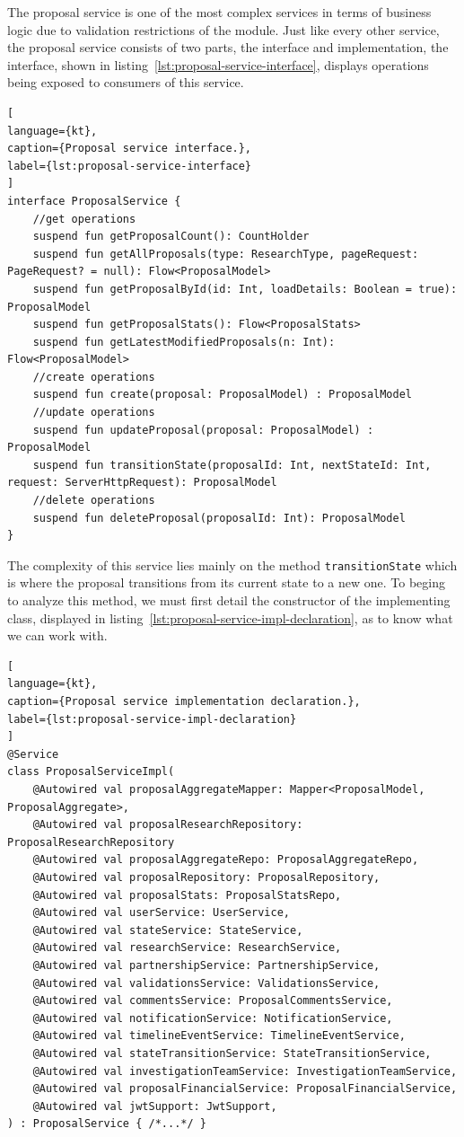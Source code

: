The proposal service is one of the most complex services in terms of business logic due to validation restrictions of the module. Just like every other service, the proposal service consists of two parts, the interface and implementation, the interface, shown in listing~\ref{lst:proposal-service-interface}, displays operations being exposed to consumers of this service.

\begin{lstlisting}[
language={kt},
caption={Proposal service interface.},
label={lst:proposal-service-interface}
]
interface ProposalService {
    //get operations
    suspend fun getProposalCount(): CountHolder
    suspend fun getAllProposals(type: ResearchType, pageRequest: PageRequest? = null): Flow<ProposalModel>
    suspend fun getProposalById(id: Int, loadDetails: Boolean = true): ProposalModel
    suspend fun getProposalStats(): Flow<ProposalStats>
    suspend fun getLatestModifiedProposals(n: Int): Flow<ProposalModel>
    //create operations
    suspend fun create(proposal: ProposalModel) : ProposalModel
    //update operations
    suspend fun updateProposal(proposal: ProposalModel) : ProposalModel
    suspend fun transitionState(proposalId: Int, nextStateId: Int, request: ServerHttpRequest): ProposalModel
    //delete operations
    suspend fun deleteProposal(proposalId: Int): ProposalModel
}
\end{lstlisting}

The complexity of this service lies mainly on the method \lstinline{transitionState} which is where the proposal transitions from its current state to a new one. To beging to analyze this method, we must first detail the constructor of the implementing class, displayed in listing~\ref{lst:proposal-service-impl-declaration}, as to know what we can work with. 

\begin{lstlisting}[
language={kt},
caption={Proposal service implementation declaration.},
label={lst:proposal-service-impl-declaration}
]
@Service
class ProposalServiceImpl(
    @Autowired val proposalAggregateMapper: Mapper<ProposalModel, ProposalAggregate>,
    @Autowired val proposalResearchRepository: ProposalResearchRepository
    @Autowired val proposalAggregateRepo: ProposalAggregateRepo,
    @Autowired val proposalRepository: ProposalRepository,
    @Autowired val proposalStats: ProposalStatsRepo,
    @Autowired val userService: UserService,
    @Autowired val stateService: StateService,
    @Autowired val researchService: ResearchService,
    @Autowired val partnershipService: PartnershipService,
    @Autowired val validationsService: ValidationsService,
    @Autowired val commentsService: ProposalCommentsService,
    @Autowired val notificationService: NotificationService,
    @Autowired val timelineEventService: TimelineEventService,
    @Autowired val stateTransitionService: StateTransitionService,
    @Autowired val investigationTeamService: InvestigationTeamService,
    @Autowired val proposalFinancialService: ProposalFinancialService,
    @Autowired val jwtSupport: JwtSupport,
) : ProposalService { /*...*/ }
\end{lstlisting}

